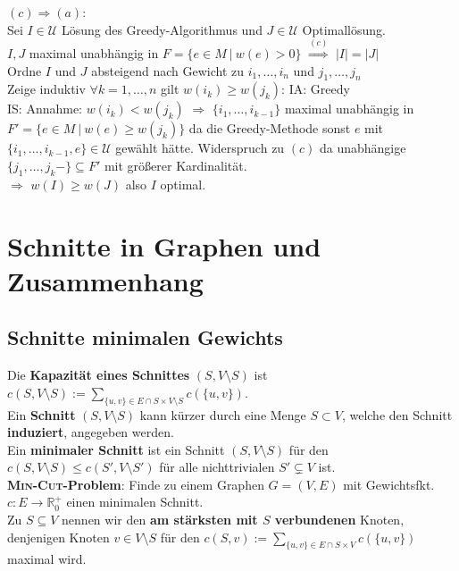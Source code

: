 \documentclass[a4paper,10pt]{scrartcl}
\newcommand{\tbf}{\textbf}
\newcommand{\tsc}{\textsc}
\newcommand{\Ra}{\Rightarrow}
\newcommand{\Gr}{$G = (V,E)$ }
\newcommand{\Gwfktp}{$c: E \rightarrow \mathbb{R}_0^+$ }
\newcommand{\Cut}{$(S,V \setminus S)$ }
\newcommand{\calU}{\mathcal{U}}
\begin{document}
$(c) \Ra (a)$: \\
Sei $I \in \calU$ Lösung des Greedy-Algorithmus und $J \in \calU$ Optimallösung. \\
$I, J$ maximal unabhängig in $F = \{e \in M \ | \ w(e) > 0\}$ $\overset{(c)}{\Ra}$ $|I| = |J|$ \\
Ordne $I$ und $J$ absteigend nach Gewicht zu $i_1, \ldots, i_n$ und $j_1, \ldots, j_n$ \\
Zeige induktiv $\forall k = 1, \ldots, n$ gilt $w(i_k) \geq w(j_k)$: IA: Greedy \checkmark \\
IS: Annahme: $w(i_k) < w(j_k)$ $\Ra$ $\{i_1, \ldots, i_{k-1}\}$ maximal unabhängig in $F' = \{e \in M \ | \ w(e) \geq w(j_k)\}$ da die Greedy-Methode sonst $e$ mit $\{i_1, \ldots, i_{k-1}, e\} \in \calU$ gewählt hätte. Widerspruch zu $(c)$ da unabhängige $\{j_1, \ldots, j_k-\} \subseteq F'$ mit größerer Kardinalität. \\
$\Ra$ $w(I) \geq w(J)$ also $I$ optimal. \\

\newpage
\section{Schnitte in Graphen und Zusammenhang}
\subsection{Schnitte minimalen Gewichts}
Die \tbf{Kapazität eines Schnittes} \Cut ist $c(S,V \setminus S) := \sum_{\{u,v\} \in E \cap S \times V \setminus S} \limits c(\{u,v\})$. \\

Ein \tbf{Schnitt} \Cut kann kürzer durch eine Menge $S \subset V$, welche den Schnitt \tbf{induziert}, angegeben werden. \\

Ein \tbf{minimaler Schnitt} ist ein Schnitt \Cut für den $c(S,V \setminus S) \leq c(S',V \setminus S')$ für alle nichttrivialen $S' \subsetneq V$ ist. \\

\tbf{\tsc{Min-Cut}-Problem}: Finde zu einem Graphen \Gr mit Gewichtsfkt. \Gwfktp einen minimalen Schnitt. \\

Zu $S \subseteq V$ nennen wir den \tbf{am stärksten mit $S$ verbundenen} Knoten, denjenigen Knoten $v \in V \setminus S$ für den $c(S,v) := \sum_{\{u,v\} \in E \cap S \times V} \limits c(\{u,v\})$ maximal wird. \\
\end{document}
